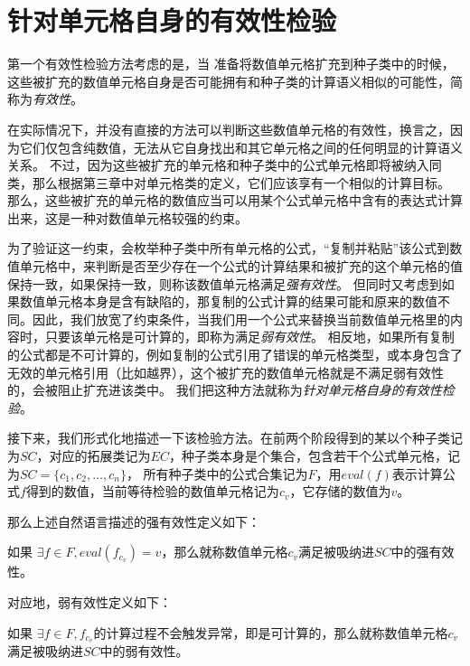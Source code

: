 \section{针对单元格自身的有效性检验}

第一个有效性检验方法考虑的是，当 \wa 准备将数值单元格扩充到种子类中的时候，这些被扩充的数值单元格自身是否可能拥有和种子类的计算语义相似的可能性，简称为\textit{有效性}。

在实际情况下，并没有直接的方法可以判断这些数值单元格的有效性，换言之，因为它们仅包含纯数值，无法从它自身找出和其它单元格之间的任何明显的计算语义关系。
不过，因为这些被扩充的单元格和种子类中的公式单元格即将被纳入同类，那么根据第三章中对单元格类的定义，它们应该享有一个相似的计算目标。
那么，这些被扩充的单元格的数值应当可以用某个公式单元格中含有的表达式计算出来，这是一种对数值单元格较强的约束。

为了验证这一约束，\wa 会枚举种子类中所有单元格的公式，“复制并粘贴”该公式到数值单元格中，来判断是否至少存在一个公式的计算结果和被扩充的这个单元格的值保持一致，如果保持一致，则称该数值单元格满足\textit{强有效性}。
但同时又考虑到如果数值单元格本身是含有缺陷的，那复制的公式计算的结果可能和原来的数值不同。因此，我们放宽了约束条件，当我们用一个公式来替换当前数值单元格里的内容时，只要该单元格是可计算的，即称为满足\textit{弱有效性}。
相反地，如果所有复制的公式都是不可计算的，例如复制的公式引用了错误的单元格类型，或本身包含了无效的单元格引用（比如越界），这个被扩充的数值单元格就是不满足弱有效性的，会被阻止扩充进该类中。
我们把这种方法就称为\textit{针对单元格自身的有效性检验}。

接下来，我们形式化地描述一下该检验方法。在前两个阶段得到的某以个种子类记为$SC$，对应的拓展类记为$EC$，种子类本身是个集合，包含若干个公式单元格，记为$SC= \{c_{1}, c_{2}, \dots, c_{n}\}$， 所有种子类中的公式合集记为$F$，用$eval(f)$表示计算公式$f$得到的数值，当前等待检验的数值单元格记为$c_v$，它存储的数值为$v$。

那么上述自然语言描述的强有效性定义如下：
\begin{definition}
    如果 $\exists f \in F,  eval(f_{c_v}) = v$，那么就称数值单元格$c_v$满足被吸纳进$SC$中的强有效性。   
\end{definition}

对应地，弱有效性定义如下：
\begin{definition}
    如果 $\exists f \in F, f_{c_v}$的计算过程不会触发异常，即是可计算的，那么就称数值单元格$c_v$满足被吸纳进$SC$中的弱有效性。
\end{definition}

